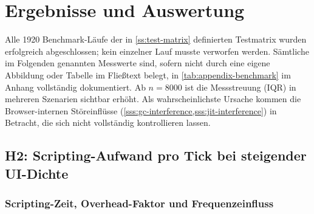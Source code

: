 \chapter{Ergebnisse und Auswertung}
\label{ch:results}

Alle 1920 Benchmark-Läufe der in \cref{ss:test-matrix} definierten Testmatrix wurden erfolgreich abgeschlossen; kein einzelner Lauf musste verworfen werden. Sämtliche im Folgenden genannten Messwerte sind, sofern nicht durch eine eigene Abbildung oder Tabelle im Fließtext belegt, in \cref{tab:appendix-benchmark} im Anhang vollständig dokumentiert. Ab $n = 8000$ ist die Messstreuung (IQR) in mehreren Szenarien sichtbar erhöht. Als wahrscheinlichste Ursache kommen die Browser-internen Störeinflüsse (\cref{sss:gc-interference,sss:jit-interference}) in Betracht, die sich nicht vollständig kontrollieren lassen.

\section{H2: Scripting-Aufwand pro Tick bei steigender UI-Dichte}
\label{s:results-h2}

\subsection{Scripting-Zeit, Overhead-Faktor und Frequenzeinfluss}
\label{ss:results-h2-scripting}

